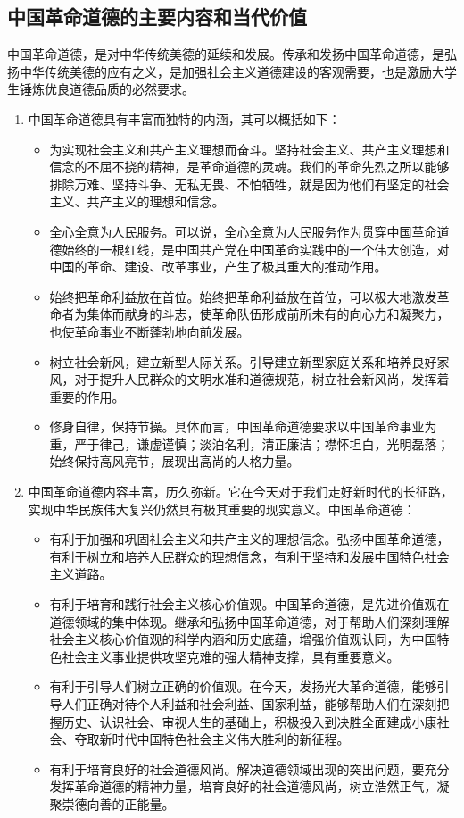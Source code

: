 \subsection{中国革命道德的主要内容和当代价值}
中国革命道德，是对中华传统美德的延续和发展。传承和发扬中国革命道德，是弘扬中华传统美德的应有之义，是加强社会主义道德建设的客观需要，也是激励大学生锤炼优良道德品质的必然要求。
\begin{enumerate}
\item 中国革命道德具有丰富而独特的内涵，其可以概括如下：
\begin{itemize}
\item 为实现社会主义和共产主义理想而奋斗。坚持社会主义、共产主义理想和信念的不屈不挠的精神，是革命道德的灵魂。我们的革命先烈之所以能够排除万难、坚持斗争、无私无畏、不怕牺牲，就是因为他们有坚定的社会主义、共产主义的理想和信念。
\item 全心全意为人民服务。可以说，全心全意为人民服务作为贯穿中国革命道德始终的一根红线，是中国共产党在中国革命实践中的一个伟大创造，对中国的革命、建设、改革事业，产生了极其重大的推动作用。
\item 始终把革命利益放在首位。始终把革命利益放在首位，可以极大地激发革命者为集体而献身的斗志，使革命队伍形成前所未有的向心力和凝聚力，也使革命事业不断蓬勃地向前发展。
\item 树立社会新风，建立新型人际关系。引导建立新型家庭关系和培养良好家风，对于提升人民群众的文明水准和道德规范，树立社会新风尚，发挥着重要的作用。
\item 修身自律，保持节操。具体而言，中国革命道德要求以中国革命事业为重，严于律己，谦虚谨慎；淡泊名利，清正廉洁；襟怀坦白，光明磊落；始终保持高风亮节，展现出高尚的人格力量。
\end{itemize}
\item 中国革命道德内容丰富，历久弥新。它在今天对于我们走好新时代的长征路，实现中华民族伟大复兴仍然具有极其重要的现实意义。中国革命道德：
\begin{itemize}
\item 有利于加强和巩固社会主义和共产主义的理想信念。弘扬中国革命道德，有利于树立和培养人民群众的理想信念，有利于坚持和发展中国特色社会主义道路。
\item 有利于培育和践行社会主义核心价值观。中国革命道德，是先进价值观在道德领域的集中体现。继承和弘扬中国革命道德，对于帮助人们深刻理解社会主义核心价值观的科学内涵和历史底蕴，增强价值观认同，为中国特色社会主义事业提供攻坚克难的强大精神支撑，具有重要意义。
\item 有利于引导人们树立正确的价值观。在今天，发扬光大革命道德，能够引导人们正确对待个人利益和社会利益、国家利益，能够帮助人们在深刻把握历史、认识社会、审视人生的基础上，积极投入到决胜全面建成小康社会、夺取新时代中国特色社会主义伟大胜利的新征程。
\item 有利于培育良好的社会道德风尚。解决道德领域出现的突出问题，要充分发挥革命道德的精神力量，培育良好的社会道德风尚，树立浩然正气，凝聚崇德向善的正能量。
\end{itemize}
\end{enumerate}

